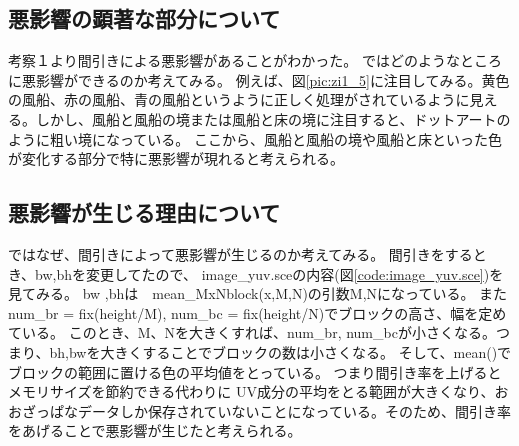 \documentclass[a4j]{jsarticle}
\begin{document}
\subsection{悪影響の顕著な部分について}
考察１より間引きによる悪影響があることがわかった。
ではどのようなところに悪影響ができるのか考えてみる。
例えば、図\ref{pic:zi1_5}に注目してみる。黄色の風船、赤の風船、青の風船というように正しく処理がされているように見える。しかし、風船と風船の境または風船と床の境に注目すると、ドットアートのように粗い境になっている。
ここから、風船と風船の境や風船と床といった色が変化する部分で特に悪影響が現れると考えられる。

\subsection{悪影響が生じる理由について}
ではなぜ、間引きによって悪影響が生じるのか考えてみる。
間引きをするとき、bw,bhを変更してたので、
image\_yuv.sceの内容(図\ref{code:image_yuv.sce})を見てみる。
bw ,bhは　mean\_MxNblock(x,M,N)の引数M,Nになっている。
また
num\_br = fix(height/M), num\_bc = fix(height/N)でブロックの高さ、幅を定めている。
このとき、M、Nを大きくすれば、num\_br, num\_bcが小さくなる。つまり、bh,bwを大きくすることでブロックの数は小さくなる。
そして、mean()でブロックの範囲に置ける色の平均値をとっている。
つまり間引き率を上げるとメモリサイズを節約できる代わりに
UV成分の平均をとる範囲が大きくなり、おおざっぱなデータしか保存されていないことになっている。そのため、間引き率をあげることで悪影響が生じたと考えられる。
\end{document}
